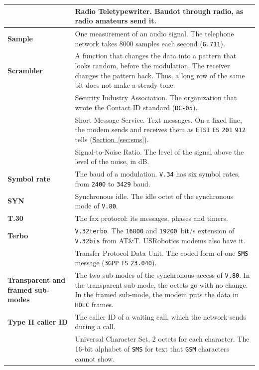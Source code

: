 \documentclass[a5paper,10pt]{article}
\newcommand{\std}[1]{\texttt{#1}}
\newcommand{\stdb}[1]{\textpdfrender{TextRenderingMode=FillStroke,
  LineWidth=0.25pt}{\texttt{#1}}}
\begin{document}
{\begin{longtable}{|>{\raggedright\arraybackslash}p{}|>{\raggedright\arraybackslash}p{}|}
\textbf{\stdb{RTTY}} & Radio Teletypewriter.  Baudot through radio, as radio amateurs send it. \\ \hline
\textbf{Sample} & One measurement of an audio signal.  The telephone network takes 8000 samples each second (\std{G.711}). \\ \hline
\textbf{Scrambler} & A function that changes the data into a pattern that looks random, before the modulation.  The receiver changes the pattern back.  Thus, a long row of the same bit does not make a steady tone. \\ \hline
\textbf{\stdb{SIA}} & Security Industry Association.  The organization that wrote the Contact ID standard (\std{DC-05}). \\ \hline
\textbf{\stdb{SMS}} & Short Message Service.  Text messages.  On a fixed line, the modem sends and receives them as \std{ETSI} \std{ES} \std{201} \std{912} tells (\hyperref[sec:sms]{Section~\ref*{sec:sms}}). \\ \hline
\textbf{\stdb{SNR}} & Signal-to-Noise Ratio.  The level of the signal above the level of the noise, in dB. \\ \hline
\textbf{Symbol rate} & The baud of a modulation.  \std{V.34} has six symbol rates, from \std{2400} to \std{3429} baud. \\ \hline
\textbf{SYN} & Synchronous idle.  The idle octet of the synchronous mode of \std{V.80}. \\ \hline
\textbf{T.30} & The fax protocol: its messages, phases and timers. \\ \hline
\textbf{Terbo} & \std{V.32terbo}.  The \std{16800} and \std{19200}~bit/s extension of \std{V.32bis} from AT\&T.  USRobotics modems also have it. \\ \hline
\textbf{\stdb{TPDU}} & Transfer Protocol Data Unit.  The coded form of one \std{SMS} message (\std{3GPP} \std{TS} \std{23.040}). \\ \hline
\textbf{Transparent and framed sub-modes} & The two sub-modes of the synchronous access of \std{V.80}.  In the transparent sub-mode, the octets go with no change.  In the framed sub-mode, the modem puts the data in \std{HDLC} frames. \\ \hline
\textbf{Type II caller ID} & The caller ID of a waiting call, which the network sends during a call. \\ \hline
\textbf{\stdb{UCS2}} & Universal Character Set, 2 octets for each character.  The 16-bit alphabet of \std{SMS} for text that \std{GSM} characters cannot show. \\ \hline

\end{longtable}}
\end{document}
